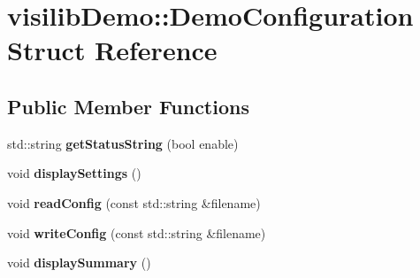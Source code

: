 \hypertarget{structvisilib_demo_1_1_demo_configuration}{}\section{visilib\+Demo\+::Demo\+Configuration Struct Reference}
\label{structvisilib_demo_1_1_demo_configuration}
\subsection*{Public Member Functions}
\begin{DoxyCompactItemize}
\item 
\mbox{\label{structvisilib_demo_1_1_demo_configuration_a405fec8ec9a60d96e49b895de9fb4d94}} 
std\+::string {\bfseries get\+Status\+String} (bool enable)
\item 
\mbox{\label{structvisilib_demo_1_1_demo_configuration_a6e6076b042ab6f753553b11f7673080a}} 
void {\bfseries display\+Settings} ()
\item 
\mbox{\label{structvisilib_demo_1_1_demo_configuration_a8266b36d59ef7b547cc1561a5fe0e614}} 
void {\bfseries read\+Config} (const std\+::string \&filename)
\item 
\mbox{\label{structvisilib_demo_1_1_demo_configuration_adc704f906265b740bcb80f7af4605c13}} 
void {\bfseries write\+Config} (const std\+::string \&filename)
\item 
\mbox{\label{structvisilib_demo_1_1_demo_configuration_a4e545caddb6af6d1c64f9334d96fa076}} 
void {\bfseries display\+Summary} ()
\end{DoxyCompactItemize}
